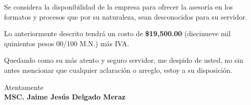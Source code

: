 \documentclass[10pt,letterpaper,sans]{moderncv}
\begin{document}
Se considera la disponibilidad de la empresa para ofrecer la asesoría en los formatos y procesos que por su naturaleza, sean desconocidos para su servidor.

Lo anteriormente descrito tendrá un costo de \textbf{\$19,500.00} (diecinueve mil quinientos pesos 00/100 M.N.) más IVA.

Quedando como su más atento y seguro servidor, me despido de usted, no sin antes mencionar que cualquier aclaración o arreglo, estoy a su disposición.

\vspace{0.5cm}Atentamente\vspace{1.5cm}\\\textbf{MSC. Jaime Jesús Delgado Meraz}

\end{document}
